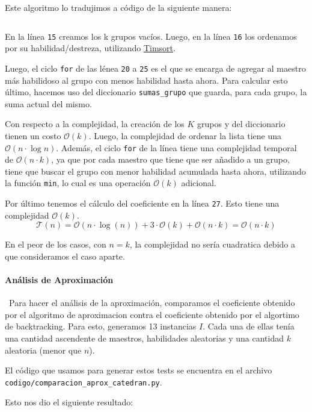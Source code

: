 \documentclass{article}
\begin{document}
Este algoritmo lo tradujimos a código de la siguiente manera:

\inputminted[linenos, firstline=3, lastline=29]{python}{codigo/aproximacion_catedra.py}

En la línea \texttt{15} creamos los k grupos vacíos. Luego, en la línea \texttt{16} los ordenamos por su habilidad/destreza, utilizando \href{https://svn.python.org/projects/python/trunk/Objects/listsort.txt}{Timsort}.

Luego, el ciclo \texttt{for} de las lénea \texttt{20} a \texttt{25} es el que se encarga de agregar al maestro más habilidoso al grupo con menos habilidad hasta ahora. Para calcular esto último, hacemos uso del diccionario \texttt{sumas\_grupo} que guarda, para cada grupo, la suma actual del mismo. 

Con respecto a la complejidad, la creación de los $K$ grupos y del diccionario tienen un costo $\mathcal{O}(k)$. Luego, la complejidad de ordenar la lista tiene una  $\mathcal{O}(n \cdot \log n)$.
Además, el ciclo \texttt{for} de la línea tiene  una complejidad temporal de $\mathcal{O}(n \cdot k)$, ya que por cada maestro que tiene que ser añadido a un grupo, tiene que buscar el grupo con menor habilidad acumulada hasta ahora, utilizando la función \texttt{min}, lo cual es una operación $\mathcal{O}(k)$ adicional. 

Por último tenemos el cálculo del coeficiente en la línea \texttt{27}. Esto tiene una complejidad $\mathcal{O}(k)$.
$$
\mathcal{T}(n) = \mathcal{O}(n \cdot \log (n)) + 3 \cdot \mathcal{O}(k) + \mathcal{O}(n \cdot k) = \mathcal{O}(n \cdot k)
$$

En el peor de los casos, con $n = k$, la complejidad no sería cuadratica debido a que consideramos el caso aparte.

\paragraph{Análisis de Aproximación} \
Para hacer el análisis de la aproximación, comparamos el coeficiente obtenido por el algoritmo de aproximacion contra el coeficiente obtenido por el algortimo de backtracking.
Para esto, generamos 13 instancias $I$. Cada una de ellas tenía una cantidad ascendente de maestros, habilidades aleatorias y una cantidad $k$ aleatoria (menor que $n$).

El código que usamos para generar estos tests se encuentra en el archivo \texttt{codigo/comparacion\_aprox\_catedran.py}.

Esto nos dio el siguiente resultado: 
\end{document}
